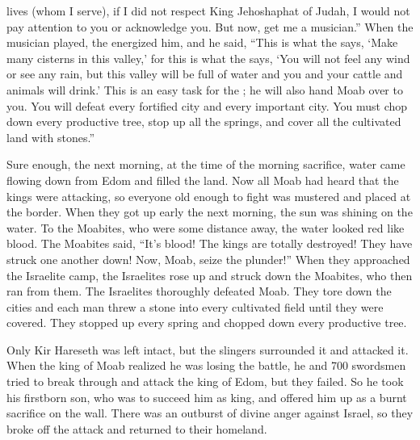{lives
(whom
I serve), if
I did not respect
King
Jehoshaphat
of Judah,
I
would not
pay attention to you or
acknowledge you.
But now,
get
me a musician.”
When
the musician
played,
the {}
energized him,
and he said,
“This is what
the {}
says,
‘Make
many
cisterns
in this
valley,’
for
this is what
the {}
says, ‘You will not
feel
any wind
or
see
any rain,
but this valley
will be full
of water
and you
and your cattle
and animals
will drink.’
This
is an easy
task for the
{}; he will
also
hand
Moab
over to you.
You will defeat
every
fortified
city
and every
important
city.
You must chop down
every
productive
tree,
stop up
all
the springs,
and cover
all
the cultivated
land
with stones.”
\par }{\PP {}Sure enough, the next
morning,
at
the time
of the morning
sacrifice,
water
came
flowing
down
from Edom
and filled
the land.
Now all
Moab
had heard
that
the kings
were attacking,
so everyone
old enough
to fight
was mustered
and placed
at
the border.
When they got up early
the next morning,
the sun
was shining
on
the water.
To the Moabites,
who were some distance
away, the water
looked red
like blood.
The Moabites said,
“It’s
blood! The kings
are totally
destroyed!
 They have struck
one
another
down! Now,
Moab,
seize the plunder!”
When they approached
the Israelite
camp,
the Israelites
rose up
and struck down
the Moabites,
who then ran
from
them. The Israelites thoroughly defeated
Moab.
They tore down
the cities
and each man
threw
a stone
into every
cultivated
field
until they were covered.
They stopped up
every
spring
and chopped down
every
productive
tree.
\par }{\PP Only
Kir Hareseth
was left
intact,
but the slingers
surrounded
it and attacked it.
When
the king
of Moab
realized
he was losing
the battle,
he and 700
swordsmen
tried
to
break through
and attack
the king
of Edom,
but
they failed.
So he took
his firstborn
son,
who
was to succeed him as king,
and offered
him up
as a burnt sacrifice
on
the wall.
There
was an outburst
of divine anger against
Israel,
so they broke
off the attack
and
returned
to their homeland.

}
